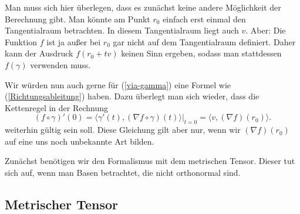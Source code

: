 \documentclass[a4paper,12pt,fleqn]{article}
\begin{document}
Man muss sich hier überlegen, dass es zunächst keine andere Möglichkeit
der Berechnung gibt. Man könnte am Punkt $r_0$ einfach erst einmal
den Tangentialraum betrachten. In diesem Tangentialraum liegt auch
$v$. Aber: Die Funktion $f$ ist ja außer bei $r_0$
gar nicht auf dem Tangentialraum definiert. Daher kann der Ausdruck
$f(r_0+tv)$ keinen Sinn ergeben, sodass man stattdessen
$f(\gamma)$ verwenden muss.

Wir würden nun auch gerne für (\ref{via-gamma}) eine Formel
wie (\ref{Richtungsableitung}) haben. Dazu überlegt man sich wieder,
dass die Kettenregel in der Rechnung
\begin{equation}
(f\circ\gamma)'(0)
= \langle \gamma'(t),(\nabla f\circ\gamma)(t)\rangle\Big|_{t=0}
= \langle v,(\nabla f)(r_0)\rangle.
\end{equation}
weiterhin gültig sein soll. Diese Gleichung gilt aber nur,
wenn wir $(\nabla f)(r_0)$ auf eine uns noch unbekannte Art
bilden.

Zunächst benötigen wir den Formalismus mit dem metrischen Tensor.
Dieser tut sich auf, wenn man Basen betrachtet, die nicht
orthonormal sind.

\subsection{Metrischer Tensor}
\end{document}
